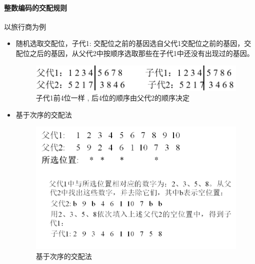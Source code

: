 \documentclass[UTF8,a4paper]{ctexart}
\begin{document}
\paragraph{整数编码的交配规则 } 以旅行商为例
\begin{itemize}
	\item 随机选取交配位，子代1: 交配位之前的基因选自父代1交配位之前的基因，交配位之后的基因，从父代2中按顺序选取那些在子代1中还没有出现过的基因。
	      \begin{figure}[H]
		      \centering
		      \includegraphics[scale = 0.3]{assets/ArtificialIntelligence/2018-01-09-14-40-57.png}
		      \caption{子代1前4位一样 , 后4位的顺序由父代2的顺序决定}
	      \end{figure}
	\item 基于次序的交配法
	      \begin{figure}[H]
		      \centering
		      \includegraphics[scale = 0.5]{assets/ArtificialIntelligence/2018-01-09-14-43-07.png}
		      \caption{基于次序的交配法}
	      \end{figure}


\end{itemize}
\end{document}

